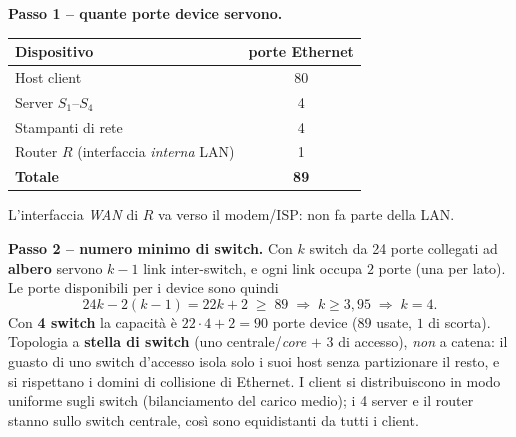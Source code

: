 \documentclass{report}
\begin{document}
\begin{solution}
\textbf{Passo 1 -- quante porte device servono.}
\begin{center}
\begin{tabular}{lc}
\hline
Dispositivo & porte Ethernet \\
\hline
Host client & 80 \\
Server $S_1$--$S_4$ & 4 \\
Stampanti di rete & 4 \\
Router $R$ (interfaccia \emph{interna} LAN) & 1 \\
\hline
\textbf{Totale} & \textbf{89} \\
\hline
\end{tabular}
\end{center}
L'interfaccia \emph{WAN} di $R$ va verso il modem/ISP: non fa parte della LAN.

\textbf{Passo 2 -- numero minimo di switch.} Con $k$ switch da 24 porte collegati
ad \textbf{albero} servono $k-1$ link inter-switch, e ogni link occupa $2$ porte
(una per lato). Le porte disponibili per i device sono quindi
\[
24k - 2(k-1) = 22k + 2 \;\ge\; 89 \;\Longrightarrow\; k \ge 3{,}95 \;\Longrightarrow\; k=4 .
\]
Con \textbf{4 switch} la capacità è $22\cdot4+2 = 90$ porte device ($89$ usate, $1$
di scorta). Topologia a \textbf{stella di switch} (uno centrale/\emph{core} $+$ 3
di accesso), \emph{non} a catena: il guasto di uno switch d'accesso isola solo i
suoi host senza partizionare il resto, e si rispettano i domini di collisione di
Ethernet. I client si distribuiscono in modo uniforme sugli switch (bilanciamento
del carico medio); i 4 server e il router stanno sullo switch centrale, così sono
equidistanti da tutti i client.


\end{solution}
\end{document}
